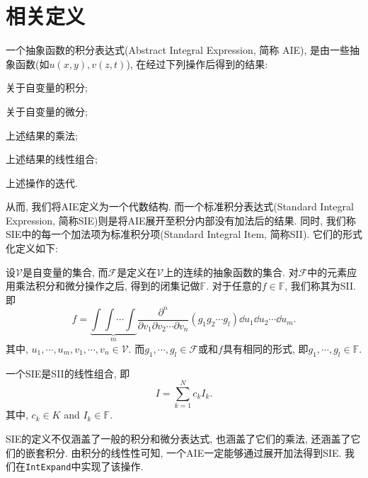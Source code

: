 \section{相关定义}\label{Definitions-03}
\begin{definition}
一个抽象函数的积分表达式(Abstract Integral Expression, 简称 AIE), 是由一些抽象函数(如$u(x,y),v(z,t)$), 在经过下列操作后得到的结果:
\begin{compactenum}[(1) ]
\item 关于自变量的积分;
\item 关于自变量的微分;
\item 上述结果的乘法;
\item 上述结果的线性组合;
\item 上述操作的迭代.
\end{compactenum}
\end{definition}

从而, 我们将AIE定义为一个代数结构. 而一个标准积分表达式(Standard Integral Expression, 简称SIE)则是将AIE展开至积分内部没有加法后的结果. 同时, 我们称SIE中的每一个加法项为标准积分项(Standard Integral Item, 简称SII). 它们的形式化定义如下:
\begin{definition}
设$\mathcal V$是自变量的集合, 而$\mathcal F$是定义在$\mathcal V$上的连续的抽象函数的集合. 对$\mathcal F$中的元素应用乘法\zdh 积分和微分操作之后, 得到的闭集记做$\mathbb F$. 对于任意的$f\in\mathbb{F}$, 我们称其为SII. 即
\begin{equation} 
f =\underbrace{\int\!\int\!\cdots\!\int}_m{ \frac{\partial^n}{\partial v_1 \partial v_2 \cdots \partial v_n} (g_1 g_2 \cdots g_l)\dd u_1 \dd u_2 \cdots \dd u_m}.
\label{int_form}
\end{equation} 
其中, $u_1,\cdots,u_m,v_1,\cdots,v_n \in \mathcal V$. 而$g_1,\cdots,g_l \in \mathcal F$或和$f$具有相同的形式, 即$g_1,\cdots,g_l \in \mathbb F$.
\end{definition}

\begin{definition}
一个SIE是SII的线性组合, 即
\begin{equation}
I = \sum_{k=1}^N{c_k I_k}.
\label{std_form}
\end{equation} 
其中, $c_k \in K$ and $I_k \in \mathbb F$. 
\end{definition}

SIE的定义不仅涵盖了一般的积分和微分表达式, 也涵盖了它们的乘法, 还涵盖了它们的嵌套积分. 由积分的线性性可知, 一个AIE一定能够通过展开加法得到SIE. 我们在\texttt{IntExpand}中实现了该操作. 

